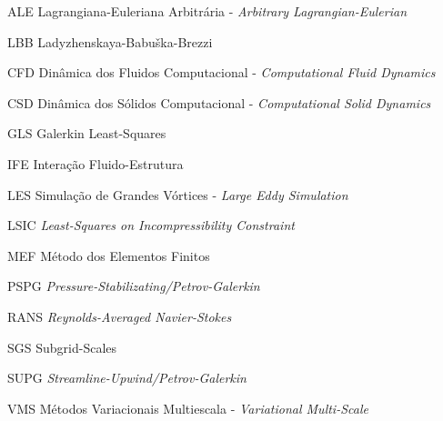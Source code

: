\documentclass[12pt,
	openright,	%
	twoside,    %
	a4paper,			%
	sumario=tradicional,
	english,			%
	french, 			%
	brazil				%
]{USPSC}
\begin{document}
\listoffigures*
\cleardoublepage
\listoftables*
\cleardoublepage
\begin{siglas}
	\item[ALE] Lagrangiana-Euleriana Arbitrária - \textit{Arbitrary Lagrangian-Eulerian}
    \item[LBB] Ladyzhenskaya-Babuška-Brezzi
	\item[CFD] Dinâmica dos Fluidos Computacional - \textit{Computational Fluid Dynamics}
	\item[CSD] Dinâmica dos Sólidos Computacional - \textit{Computational Solid Dynamics}
    \item[GLS] Galerkin Least-Squares
	\item[IFE] Interação Fluido-Estrutura
	\item[LES] Simulação de Grandes Vórtices - \textit{Large Eddy Simulation}
    \item[LSIC] \textit{Least-Squares on Incompressibility Constraint}
	\item[MEF] Método dos Elementos Finitos
    \item[PSPG] \textit{Pressure-Stabilizating/Petrov-Galerkin}
	\item[RANS] \textit{Reynolds-Averaged Navier-Stokes}
    \item[SGS] Subgrid-Scales
    \item[SUPG] \textit{Streamline-Upwind/Petrov-Galerkin}
	\item[VMS] Métodos Variacionais Multiescala - \textit{Variational Multi-Scale}
\end{siglas}
\end{document}
